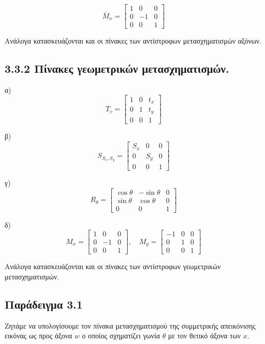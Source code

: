 \[
\bar{M}_x = \begin{bmatrix} 1 & 0 & 0 \\ 0 & -1 & 0 \\ 0 & 0 & 1 \end{bmatrix}
\]

 Ανάλογα κατασκευάζονται και οι πίνακες των αντίστροφων μετασχηματισμών αξόνων.

\subsection*{3.3.2 Πίνακες γεωμετρικών μετασχηματισμών.}

 α)
\[
T_v = \begin{bmatrix} 1 & 0 & t_x \\ 0 & 1 & t_y \\ 0 & 0 & 1 \end{bmatrix}
\]

 β)  
\[
S_{S_x,S_y} = \begin{bmatrix} S_x & 0 & 0 \\ 0 & S_y & 0 \\ 0 & 0 & 1 \end{bmatrix}
\]

 γ)
\[
R_{\theta} = \begin{bmatrix} \cos\theta & -\sin\theta & 0 \\ \sin\theta & \cos\theta & 0 \\ 0 & 0 & 1 \end{bmatrix}
\]

 δ) 
\[
M_x = \begin{bmatrix} 1 & 0 & 0 \\ 0 & -1 & 0 \\ 0 & 0 & 1 \end{bmatrix}, \quad M_y = \begin{bmatrix} -1 & 0 & 0 \\ 0 & 1 & 0 \\ 0 & 0 & 1 \end{bmatrix}
\]

 Ανάλογα κατασκευάζονται και οι πίνακες των αντίστροφων γεωμετρικών μετασχηματισμών.

\subsection{Παράδειγμα 3.1}
 Ζητάμε να υπολογίσουμε τον πίνακα μετασχηματισμού της συμμετρικής απεικόνισης εικόνας ως προς άξονα \( w \) ο οποίος σχηματίζει γωνία \( \theta \) με τον θετικό άξονα των \( x. \)

